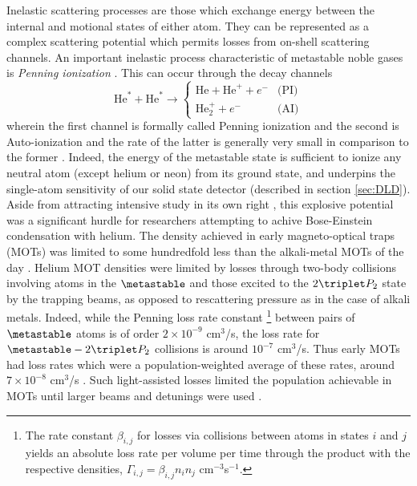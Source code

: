 	Inelastic scattering processes are those which exchange energy between the internal and motional states of either atom.
	They can be represented as a complex scattering potential \cite{Leo01} which permits losses from on-shell scattering channels.
	An important inelastic process characteristic of metastable noble gases is \emph{Penning ionization} \cite{VassenReview}.
	 This can occur through the decay channels
	\begin{equation}
		\textrm{He}^*+\textrm{He}^*\rightarrow 
		\begin{cases}
			\textrm{He}+ \textrm{He}^+ + e^-&\textrm{(PI)}\\
			\textrm{He}_{2}^{+} + e^-&\textrm{(AI)}
		\end{cases}
	\end{equation}
	wherein the first channel is formally called Penning ionization and the second is  Auto-ionization and the rate of the latter is generally very small in comparison to the former \cite{Muller91}.
	Indeed, the energy of the metastable state is sufficient to ionize any neutral atom (except helium or neon) from its ground state, and underpins the single-atom sensitivity of our solid state detector (described in section \ref{sec:DLD}).
	Aside from attracting intensive study in its own right \cite{Partridge10,Stas06,Mcnamara07}, this explosive potential was a significant hurdle for researchers attempting to achive Bose-Einstein condensation with helium.
	The density achieved in early magneto-optical traps (MOTs) was limited to some hundredfold less than the alkali-metal MOTs of the day \cite{Bardou92,Kumukura92,Mastwijk98}.
	Helium MOT densities were limited by losses through two-body collisions involving atoms in the $\metastable$ and those excited to the $2\triplet P_2$ state by the trapping beams, as opposed to rescattering pressure as in the case of alkali metals.
	Indeed, while the Penning loss rate constant \footnote{The rate constant $\beta_{i,j}$ for losses via collisions between atoms in states $i$ and $j$ yields an absolute loss rate per volume per time through the product with the respective densities, $\Gamma_{i,j} = \beta_{i,j}n_i n_j$ cm$^{-3}$s$^{-1}$.} between pairs of $\metastable$ atoms is of order $2\times10^{-9}$ cm$^3$/s, the loss rate for $\metastable-2\triplet P_2$  collisions is around $10^{-7}$ cm$^3$/s.
	Thus early MOTs had loss rates which were a population-weighted average of these rates, around $7\times10^{-8}$ cm$^3$/s \cite{Weiner99}.
	Such light-assisted losses  limited the population achievable in MOTs until larger beams and detunings were used \cite{Tol99}.
